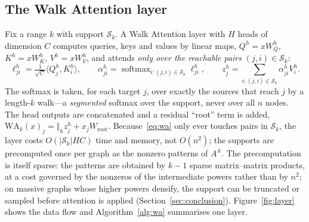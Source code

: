 \documentclass[runningheads]{llncs}
\newcommand{\Adj}{A}
\DeclareMathOperator{\softmax}{softmax}
\begin{document}
\subsection{The Walk Attention layer}\label{sec:layer}

Fix a range $k$ with support $\mathcal{S}_k$. A Walk Attention layer with $H$
heads of dimension $C$ computes queries, keys and values by linear maps,
$Q^h=xW^h_Q$, $K^h=xW^h_K$, $V^h=xW^h_V$, and attends \emph{only over the
reachable pairs} $(j,i)\in\mathcal{S}_k$:
\begin{equation}\label{eq:wa}
  \ell^h_{ji} = \tfrac{1}{\sqrt{C}}\langle Q^h_j,K^h_i\rangle,\qquad
  \alpha^h_{ji} = \softmax_{i:(j,i)\in\mathcal{S}_k}\ell^h_{ji},\qquad
  z^h_j = \textstyle\sum_{i:(j,i)\in\mathcal{S}_k}\alpha^h_{ji}V^h_i.
\end{equation}
The softmax is taken, for each target $j$, over exactly the sources that reach
$j$ by a length-$k$ walk---a \emph{segmented} softmax over the support, never
over all $n$ nodes. The head outputs are concatenated and a residual ``root''
term is added, $\mathrm{WA}_k(x)_j=\Vert_h z^h_j + x_jW_{\!\text{root}}$.
Because~\eqref{eq:wa} only ever touches pairs in $\mathcal{S}_k$, the layer
costs $O(|\mathcal{S}_k|HC)$ time and memory, not $O(n^2)$; the supports are
precomputed once per graph as the nonzero patterns of $\Adj^{\,k}$.
The precomputation is itself sparse: the patterns are obtained by $k-1$ sparse
matrix--matrix products, at a cost governed by the nonzeros of the intermediate
powers rather than by $n^2$; on massive graphs whose higher powers densify, the
support can be truncated or sampled before attention is applied
(Section~\ref{sec:conclusion}). Figure~\ref{fig:layer} shows the data flow and
Algorithm~\ref{alg:wa} summarises one layer.
\end{document}

